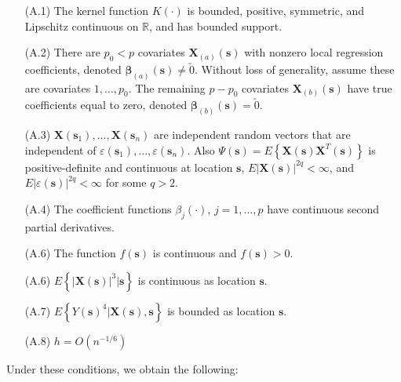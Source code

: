 \documentclass[12pt,english,authoryear, review]{article}\usepackage[]{graphicx}\usepackage[]{color}
\theoremstyle{plain}
\theoremstyle{plain}
\begin{document}
\begin{itemize}
\item[(A.1)] The kernel function $K\left(\cdot\right)$ is bounded, positive,
symmetric, and Lipschitz continuous on $\mathbb{R}$, and has bounded
support.
\item[(A.2)] There are $p_{0}<p$ covariates $\bm{X}_{\left(a\right)}\left(\bm{s}\right)$
with nonzero local regression coefficients, denoted $\bm{\beta}_{\left(a\right)}(\bm{s})\ne\utilde{0}$.
Without loss of generality, assume these are covariates $1,\dots,p_{0}$.
The remaining $p-p_{0}$ covariates $\bm{X}_{\left(b\right)}\left(\bm{s}\right)$
have true coefficients equal to zero, denoted $\bm{\beta}_{\left(b\right)}\left(\bm{s}\right)=\utilde{0}$.
\item[(A.3)] $\bm{X}\left(\bm{s}_{1}\right),\dots,\bm{X}\left(\bm{s}_{n}\right)$
are independent random vectors that are independent of $\varepsilon\left(\bm{s}_{1}\right),\dots,\varepsilon\left(\bm{s}_{n}\right)$.
Also $\Psi\left(\bm{s}\right)=E\left\{ \bm{X}\left(\bm{s}\right)\bm{X}^{T}\left(\bm{s}\right)\right\} $
is positive-definite and continuous at location $\bm{s}$, $E\left|\bm{X}\left(\bm{s}\right)\right|^{2q}<\infty$,
and $E\left|\varepsilon\left(\bm{s}\right)\right|^{2q}<\infty$ for
some $q>2$.
\item[(A.4)] The coefficient functions $ $$\beta_{j}\left(\cdot\right)$, $j=1,\dots,p$
have continuous second partial derivatives.
\item[(A.6)] The function $f\left(\bm{s}\right)$ is continuous and $f\left(\bm{s}\right)>0$.
\item[(A.6)] $E\left\{ \left|\bm{X}\left(\bm{s}\right)\right|^{3}|\bm{s}\right\} $
is continuous as location $\bm{s}$.
\item[(A.7)] $E\left\{ Y\left(\bm{s}\right)^{4}|\bm{X}\left(\bm{s}\right),\bm{s}\right\} $
is bounded as location $\bm{s}$.
\item[(A.8)] $h=O\left(n^{-1/6}\right)$
\end{itemize}
Under these conditions, we obtain the following:
\end{document}
